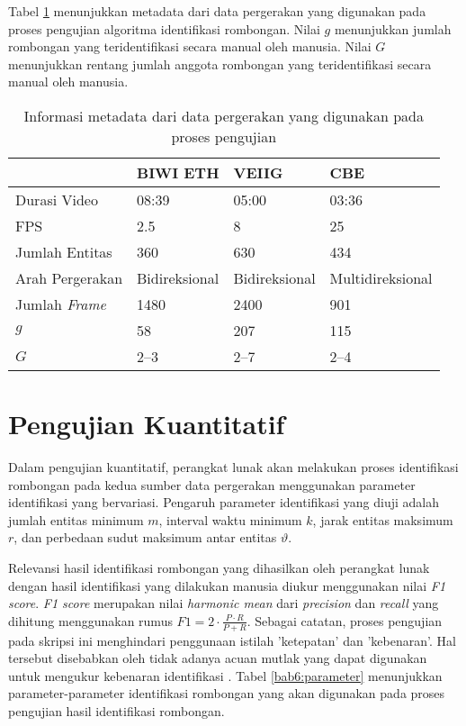 Tabel \ref{bab6:metadata-pergerakan} menunjukkan metadata dari data pergerakan yang digunakan pada proses pengujian algoritma identifikasi rombongan. Nilai $g$ menunjukkan jumlah rombongan yang teridentifikasi secara manual oleh manusia. Nilai $G$ menunjukkan rentang jumlah anggota rombongan yang teridentifikasi secara manual oleh manusia.

\begin{table}[b]
    \centering
    \caption[Metadata sumber data pergerakan]{Informasi metadata dari data pergerakan yang digunakan pada proses pengujian}
    \begin{tabular}{p{3cm} p{2.5cm} p{2.5cm} p{3cm}}
        \hline
        & \textbf{BIWI ETH} & \textbf{VEIIG} & \textbf{CBE} \\
        \hline
        Durasi Video & 08:39 & 05:00 & 03:36 \\
        FPS & 2.5 & 8 & 25 \\
        Jumlah Entitas & 360 & 630 & 434 \\
        Arah Pergerakan & Bidireksional & Bidireksional & Multidireksional \\
        Jumlah \textit{Frame} & 1480 & 2400 & 901 \\
        $g$ & 58 & 207 & 115 \\
        $G$ & 2--3 & 2--7 & 2--4 \\
        \hline
    \end{tabular}
    \label{bab6:metadata-pergerakan}
\end{table}

\section{Pengujian Kuantitatif}
\label{sec:quantitative}

Dalam pengujian kuantitatif, perangkat lunak akan melakukan proses identifikasi rombongan pada kedua sumber data pergerakan menggunakan parameter identifikasi yang bervariasi. Pengaruh parameter identifikasi yang diuji adalah jumlah entitas minimum $m$, interval waktu minimum $k$, jarak entitas maksimum $r$, dan perbedaan sudut maksimum antar entitas $\vartheta$. 

Relevansi hasil identifikasi rombongan yang dihasilkan oleh perangkat lunak dengan hasil identifikasi yang dilakukan manusia diukur menggunakan nilai \textit{F1 score}. \textit{F1 score} merupakan nilai \textit{harmonic mean} dari \textit{precision} dan \textit{recall} yang dihitung menggunakan rumus $F1 = 2 \cdot \frac{P \cdot R}{P + R}$. Sebagai catatan, proses pengujian pada skripsi ini menghindari penggunaan istilah 'ketepatan' dan 'kebenaran'. Hal tersebut disebabkan oleh tidak adanya acuan mutlak yang dapat digunakan untuk mengukur kebenaran identifikasi \cite{wiratma:software}. Tabel \ref{bab6:parameter} menunjukkan parameter-parameter identifikasi rombongan yang akan digunakan pada proses pengujian hasil identifikasi rombongan.

